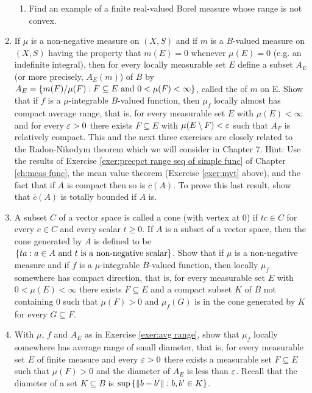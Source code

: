 \begin{enumerate}[label=\arabic*),ref=\arabic*]
\begin{enumerate}[label=\alph*),ref=\theenumi\alph*)]
    \item Find an example of a finite real-valued Borel measure whose range is not convex.
\end{enumerate}

\item\label{exer:avg range}
If $\mu$ is a non-negative measure on $(X, S)$ and if $m$ is a $B$-valued measure on $(X,S)$ having the property that $m(E)=0$ whenever $\mu(E)=0$ (e.g. an indefinite integral), then for every locally measurable set $E$ define a subset $A_E$ (or more precisely, $A_E(m)$) of $B$ by $A_E=\left\{m(F)/\mu(F):F\subseteq E\text{ and }0<\mu(F)<\infty\right\}$, called the  of $m$ on E. Show that if $f$ is a $\mu$-integrable $B$-valued function, then $\mu_f$ locally almost has compact average range, that is, for every measurable set $E$ with $\mu(E)<\infty$ and for every $\varepsilon>0$ there exists $F\subseteq E$ with $\mu(E\setminus F)<\varepsilon$ such that $A_F$ is relatively compact. This and the next three exercises are closely related to the Radon-Nikodym theorem which we will consider in Chapter 7. %
Hint: Use the results of Exercise \ref{exer:precpct range seq of simple func} of Chapter \ref{ch:meas func}, the mean value theorem (Exercise \ref{exer:mvt} above), and the fact that if $A$ is compact then so is $\overline{c}(A)$. To prove this last result, show that $\overline{c}(A)$ is totally bounded if $A$ is.

\item\label{exer:cone}
A subset $C$ of a vector space is called a cone (with vertex at 0) if $tc\in C$ for every $c\in C$ and every scalar $t\geq0$. If $A$ is a subset of a vector space, then the cone generated by $A$ is defined to be $\left\{ta:a\in A\text{ and }t\text{ is a non-negative scalar}\right\}$. Show that if $\mu$ is a non-negative measure and if $f$ is a $\mu$-integrable $B$-valued function, then locally $\mu_f$ somewhere has compact direction, that is, for every measurable set $E$ with $0<\mu(E)<\infty$ there exists $F\subseteq E$ and a compact subset $K$ of $B$ not containing $0$ such that $\mu(F)>0$ and $\mu_f(G)$ is in the cone generated by $K$ for every $G\subseteq F$.

\item\label{exer:indef int locally avg range of small diam}
With $\mu$, $f$ and $A_E$ as in Exercise \ref{exer:avg range}, show that $\mu_f$ locally somewhere has average range of small diameter, that is, for every measurable set $E$ of finite measure and every $\varepsilon>0$ there exists a measurable set $F\subseteq E$ such that $\mu(F)>0$ and the diameter of $A_E$ is less than $\varepsilon$. Recall that the diameter of a set $K\subseteq B$ is $\sup\left\{\norm{b-b'}:b,b'\in K\right\}$.


\end{enumerate}
